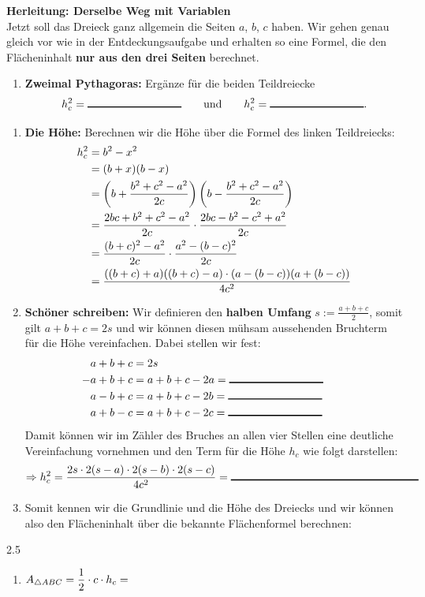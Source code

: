 \documentclass[11pt,oneside]{article}
\begin{document}
	{\bf Herleitung: Derselbe Weg mit Variablen}\\
	Jetzt soll das Dreieck ganz allgemein die Seiten $a$, $b$, $c$ haben. Wir gehen genau gleich vor wie in der Entdeckungsaufgabe und erhalten so eine Formel, die den Flächeninhalt \textbf{nur aus den drei Seiten} berechnet.
	\begin{enumerate}[label=\alph*)]
		\item \textbf{Zweimal Pythagoras:} Ergänze für die beiden Teildreiecke \[h_c^2=\gap{3}\qquad\text{und}\qquad h_c^2=\gap{3}.\]
	\end{enumerate}
	\begin{enumerate}[label=\alph*), resume]
		\item \textbf{Die Höhe:} Berechnen wir die Höhe über die Formel des linken Teildreiecks:
		\begin{align*}
			h_c^2&=b^2-x^2\\
			&=(b+x)(b-x)\\
			&=\left(b+\frac{b^2+c^2-a^2}{2c}\right)\left(b-\frac{b^2+c^2-a^2}{2c}\right)\\
			&=\frac{2bc+b^2+c^2-a^2}{2c}\cdot\frac{2bc-b^2-c^2+a^2}{2c}\\
			&=\frac{(b+c)^2-a^2}{2c}\cdot\frac{a^2-(b-c)^2}{2c}\\
			&=\frac{((b+c)+a)((b+c)-a)\cdot(a-(b-c))(a+(b-c))}{4c^2}
		\end{align*}
		\item \textbf{Schöner schreiben:} Wir definieren den \textbf{halben Umfang} $s:=\frac{a+b+c}{2}$, somit gilt $a+b+c=2s$ und wir können diesen mühsam aussehenden Bruchterm für die Höhe vereinfachen. Dabei stellen wir fest:
		\begin{align*}
			a+b+c&=2s\hspace{6cm}\\
			-a+b+c&=a+b+c-2a=\gap{3}\\
			a-b+c&=a+b+c-2b=\gap{3}\\
			a+b-c&=a+b+c-2c=\gap{3}
		\end{align*}
		Damit können wir im Zähler des Bruches an allen vier Stellen eine deutliche Vereinfachung vornehmen und den Term für die Höhe $h_c$ wie folgt darstellen: \[\Rightarrow h_c^2=\frac{2s\*2(s-a)\*2(s-b)\*2(s-c)}{4c^2}=\gap{6}\]
		\item Somit kennen wir die Grundlinie und die Höhe des Dreiecks und wir können also den Flächeninhalt über die bekannte Flächenformel berechnen:
	\end{enumerate}
	\begin{gridspace}{2.5}
		\begin{enumerate}[label=\ ,leftmargin=0cm]
			\vspace{-2mm}
			\item $\displaystyle A_{\triangle ABC}=\frac{1}{2}\cdot c\cdot h_c=$
		\end{enumerate}
	\end{gridspace}
\end{document}

